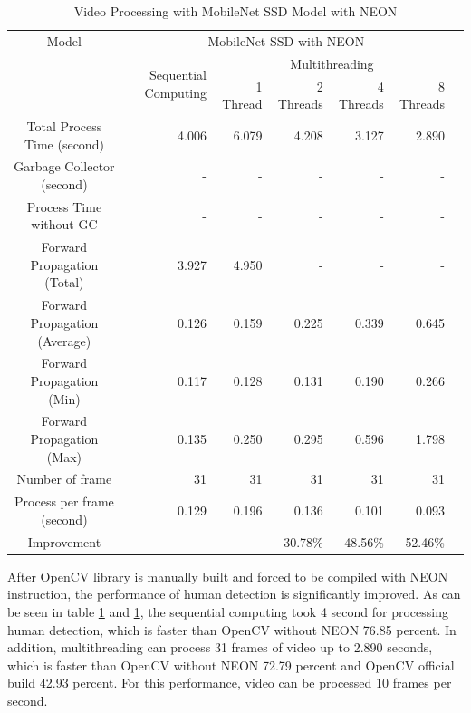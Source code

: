             \begin{table}[!htp]\centering
                \scriptsize
                \begin{tabular}{lrrrrrrr}\toprule
                    \multicolumn{2}{c}{Model} &\multicolumn{5}{c}{MobileNet SSD with NEON} \\\cmidrule{1-7}
                    \multicolumn{2}{c}{\multirow{2}{*}{}} &\multirow{2}{*}{Sequential Computing} &\multicolumn{4}{c}{Multithreading} \\\cmidrule{4-7}
                    & & &1 Thread &2 Threads &4 Threads &8 Threads \\\midrule
                    \multicolumn{2}{c}{Total Process Time (second)} &4.006 &6.079 &4.208 &3.127 &2.890 \\
                    \multicolumn{2}{c}{Garbage Collector (second)} &- &- &- &- &- \\
                    \multicolumn{2}{c}{Process Time without GC} &- &- &- &- &- \\
                    \multicolumn{2}{c}{Forward Propagation (Total)} &3.927 &4.950 &- &- &- \\
                    \multicolumn{2}{c}{Forward Propagation (Average)} &0.126 &0.159 &0.225 &0.339 &0.645 \\
                    \multicolumn{2}{c}{Forward Propagation (Min)} &0.117 &0.128 &0.131 &0.190 &0.266 \\
                    \multicolumn{2}{c}{Forward Propagation (Max)} &0.135 &0.250 &0.295 &0.596 &1.798 \\
                    \multicolumn{2}{c}{Number of frame} &31 &31 &31 &31 &31 \\
                    \multicolumn{2}{c}{Process per frame (second)} &0.129 &0.196 &0.136 &0.101 &0.093 \\
                    \multicolumn{2}{c}{Improvement} & & &30.78\% &48.56\% &52.46\% \\
                    \bottomrule
                \end{tabular}

                \caption{Video Processing with MobileNet SSD Model with NEON}\label{ssd:neon-performance}
            \end{table}

            After OpenCV library is manually built and forced to be compiled with NEON instruction,
            the performance of human detection is significantly improved.
            As can be seen in table \ref{ssd:neon-performance} and \ref{ssd:neon-performance},
            the sequential computing took 4 second for processing human detection,
            which is faster than OpenCV without NEON 76.85 percent.
            In addition, multithreading can process 31 frames of video up to 2.890 seconds,
            which is faster than OpenCV without NEON 72.79 percent and OpenCV official build 42.93 percent.
            For this performance, video can be processed 10 frames per second.


